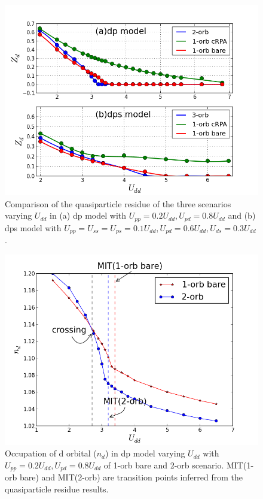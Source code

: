 \documentclass[10pt]{ruthesis}
\begin{document}
{\begin{figure}[th]
 \includegraphics[width=\columnwidth]{./plotForpublishing/dp+dps_qpw.png}
 \caption{\label{fig6}Comparison of the quasiparticle residue of the three scenarios varying $U_{dd} $ in (a) dp model with $U_{pp}=0.2U_{dd},U_{pd}=0.8U_{dd}$ and (b) dps model with $U_{pp}=U_{ss}=U_{ps}=0.1U_{dd},U_{pd}=0.6U_{dd},U_{ds}=0.3U_{dd}$.}
\end{figure}

\begin{figure}[th]
 \includegraphics[width=\columnwidth]{./plotForpublishing/nd_obto_dp.png}
 \caption{\label{figlast}Occupation of d orbital ($n_d$) in dp model varying $U_{dd}$ with $U_{pp}=0.2U_{dd},U_{pd}=0.8U_{dd}$ of 1-orb bare and 2-orb scenario. MIT(1-orb bare) and MIT(2-orb) are transition points inferred from the quasiparticle residue results.}
\end{figure}

}
\end{document}
